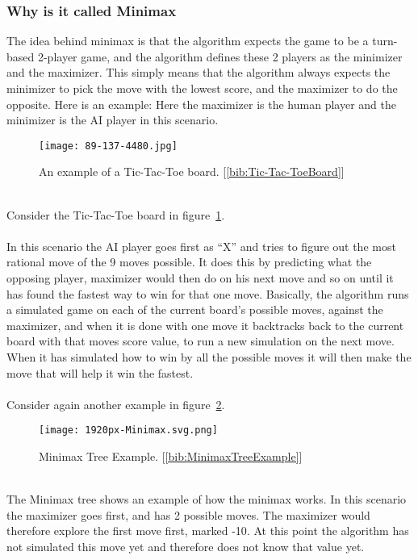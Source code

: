 \subsubsection{Why is it called Minimax}
The idea behind minimax is that the algorithm expects the game to be a turn-based 2-player game, and the algorithm defines these 2 players as the minimizer and the maximizer. 
This simply means that the algorithm always expects the minimizer to pick the move with the lowest score, and the maximizer to do the opposite. 
Here is an example: Here the maximizer is the human player and the minimizer is the AI player in this scenario.\\
\begin{figure}
    \caption{An example of a Tic-Tac-Toe board. [\ref{bib:Tic-Tac-ToeBoard}]}
    \texttt{[image: 89-137-4480.jpg]}
    \label{fig:Board Example}
\end{figure}\\
Consider the Tic-Tac-Toe board in figure~\ref{fig:Board Example}.\\\\
In this scenario the AI player goes first as “X” and tries to figure out the most rational move of the 9 moves possible. 
It does this by predicting what the opposing player, maximizer would then do on his next move and so on until it has found the fastest way to win for that one move. 
Basically, the algorithm runs a simulated game on each of the current board’s possible moves, against the maximizer, 
and when it is done with one move it backtracks back to the current board with that moves score value, to run a new simulation on the next move. 
When it has simulated how to win by all the possible moves it will then make the move that will help it win the fastest.\\\\
Consider again another example in figure~\ref{fig:Tree Example}.\\
\begin{figure}
    \caption{Minimax Tree Example. [\ref{bib:MinimaxTreeExample}]}
    \texttt{[image: 1920px-Minimax.svg.png]}
    \label{fig:Tree Example}
\end{figure}\\
The Minimax tree shows an example of how the minimax works. In this scenario the maximizer goes first, and has 2 possible moves. 
The maximizer would therefore explore the first move first, marked -10. At this point the algorithm has not simulated this move yet and therefore does not know that value yet. 
